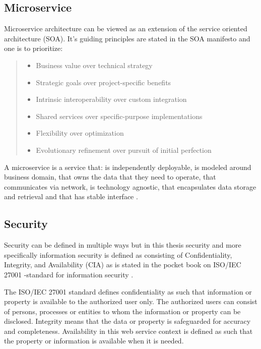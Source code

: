 \subsection{Microservice}
\begin{sloppypar}
    Microservice architecture can be viewed as an extension of the service oriented 
    architecture (SOA)\citep{newman2019,fowlerlewisms}. It's guiding principles are stated in the SOA manifesto 
    \citep{soamanifesto} and one is to prioritize:
    \begin{quotation}
        \noindent \it
        \begin{itemize}
            \item Business value over technical strategy
            \item Strategic goals over project-specific benefits 
            \item Intrinsic interoperability over custom integration 
            \item Shared services over specific-purpose implementations 
            \item Flexibility over optimization 
            \item Evolutionary refinement over pursuit of initial perfection
        \end{itemize}
    \end{quotation}
\end{sloppypar}
\begin{sloppypar}
    A microservice is a service that: is independently deployable,
    is modeled around business domain,
    that owns the data that they need to operate,
    that communicates via network,
    is technology agnostic,
    that encapsulates data storage and retrieval and 
    that has stable interface \citep{newman2019}.
\end{sloppypar}

\subsection{Security}
\begin{sloppypar}
    Security can be defined in multiple ways but in this thesis security 
    and more specifically information security is defined as consisting of 
    Confidentiality, Integrity, and Availability (CIA) as is stated in the 
    pocket book on ISO/IEC 27001 -standard for information security \citep{isoiec27001}.
\end{sloppypar}
\begin{sloppypar}
    The ISO/IEC 27001 standard defines confidentiality as such that information 
    or property is available to the authorized user only. The authorized users 
    can consist of persons, processes or entities to whom the information or 
    property can be disclosed. Integrity means that the data or property is 
    safeguarded for accuracy and completeness. Availability in this web service
    context is defined as such that the property or information is available 
    when it is needed.
\end{sloppypar}

